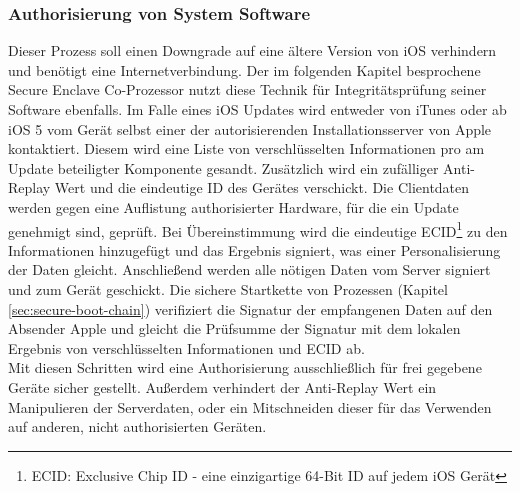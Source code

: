 	\subsubsection{Authorisierung von System Software}\label{sec:code-signing}
		Dieser Prozess soll einen Downgrade auf eine ältere Version von iOS
		verhindern und benötigt eine Internetverbindung. Der im folgenden Kapitel
		besprochene Secure Enclave Co-Prozessor nutzt diese Technik für
		Integritätsprüfung seiner Software ebenfalls. Im Falle eines iOS Updates wird
		entweder von iTunes oder ab iOS 5 vom Gerät selbst einer der autorisierenden
		Installationsserver von Apple kontaktiert. Diesem wird eine Liste von
		verschlüsselten Informationen pro am Update beteiligter Komponente gesandt.
		Zusätzlich wird ein zufälliger Anti-Replay Wert und die eindeutige ID des Gerätes
		verschickt. Die Clientdaten werden gegen eine Auflistung authorisierter Hardware, für die ein
		Update genehmigt sind, geprüft. Bei Übereinstimmung wird die eindeutige
		ECID\footnote{ECID: Exclusive Chip ID - eine einzigartige 64-Bit ID auf jedem
		iOS Gerät} zu den Informationen hinzugefügt und das Ergebnis signiert, was
		einer Personalisierung der Daten gleicht.
		Anschließend werden alle nötigen Daten vom Server signiert und zum Gerät
		geschickt. Die sichere Startkette von Prozessen (Kapitel
		\ref{sec:secure-boot-chain}) verifiziert die Signatur der empfangenen Daten
		auf den Absender Apple und gleicht die Prüfsumme der Signatur mit dem lokalen
		Ergebnis von verschlüsselten Informationen und ECID ab.\\
		Mit diesen Schritten wird eine Authorisierung ausschließlich für frei gegebene
		Geräte sicher gestellt. Außerdem verhindert der Anti-Replay Wert ein
		Manipulieren der Serverdaten, oder ein Mitschneiden dieser für
		das Verwenden auf anderen, nicht authorisierten Geräten.
		
